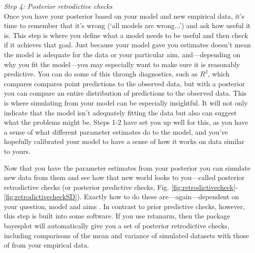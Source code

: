 \documentclass[11pt]{article}
\begin{document}
{%

\emph{Step 4: Posterior retrodictive checks} \\
Once you have your posterior based on your model and new empirical data, it's time to remember that it's wrong (`all models are wrong...') and ask how useful it is. This step is where you define what a model needs to be useful and then check if it achieves that goal. Just because your model gave you estimates doesn't mean the model is adequate for the data or your particular aim, and---depending on why you fit the model---you may especially want to make sure it is reasonably predictive. You can do some of this through diagnostics, such as $R^2$, which compares compares point predictions to the observed  data, but with a posterior you can compare an entire distribution of predictions to the observed data. This is where simulating from your model can be especially insightful. It will not only indicate that the model isn't adequately fitting the data but also can suggest what the problems might be. Steps 1-2 have set you up well for this, as you have a sense of what different parameter estimates do to the model, and you've hopefully calibrated your model to have a sense of how it works on data similar to yours.

Now that you have the parameter estimates from your posterior you can simulate new data from them and see how that new world looks to you---called posterior retrodictive checks (or posterior predictive checks, Fig. \ref{fig:retrodictivecheck}-\ref{fig:retrodictivecheckSD}). Exactly how to do these are---again---dependent on your question, model and aims \citep[but there is lots written on this,][]{held2010,gelman200ppc,conn2018}. In contrast to prior predictive checks, however, this step is built into some software. If you use \textsf{rstanarm}, then the package \textsf{bayesplot} will automatically give you a set of posterior retrodictive checks, including comparisons of the mean and variance of simulated datasets with those of from your empirical data. 

}
\end{document}
